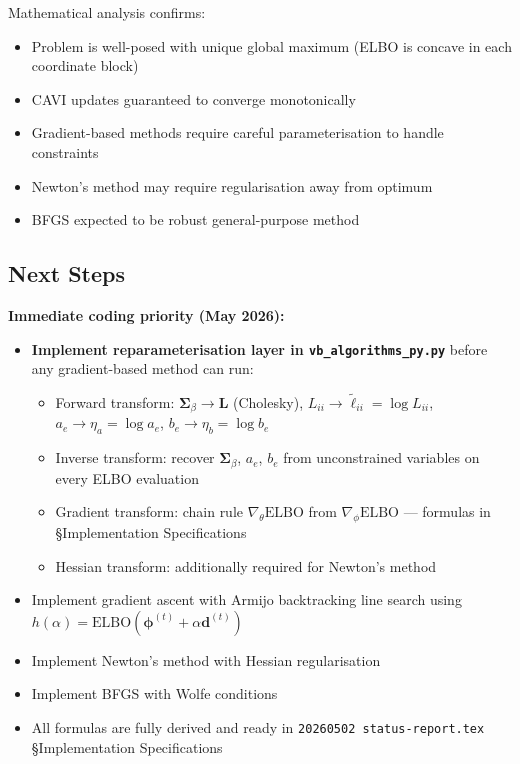 \documentclass[11pt]{article}
\begin{document}
Mathematical analysis confirms:
\begin{itemize}
\item Problem is well-posed with unique global maximum (ELBO is concave in each coordinate block)
\item CAVI updates guaranteed to converge monotonically
\item Gradient-based methods require careful parameterisation to handle constraints
\item Newton's method may require regularisation away from optimum
\item BFGS expected to be robust general-purpose method
\end{itemize}

\newpage
\subsection*{Next Steps}

\textbf{Immediate coding priority (May 2026):}
\begin{itemize}
  \item[\textbf{!}] \textbf{Implement reparameterisation layer in \texttt{vb\_algorithms\_py.py}} before any gradient-based method can run:
  \begin{itemize}
    \item Forward transform: $\bm{\Sigma}_\beta \to \bm{L}$ (Cholesky), $L_{ii} \to \tilde\ell_{ii} = \log L_{ii}$, $a_e \to \eta_a = \log a_e$, $b_e \to \eta_b = \log b_e$
    \item Inverse transform: recover $\bm{\Sigma}_\beta$, $a_e$, $b_e$ from unconstrained variables on every ELBO evaluation
    \item Gradient transform: chain rule $\nabla_\theta \text{ELBO}$ from $\nabla_\phi \text{ELBO}$ --- formulas in \S Implementation Specifications
    \item Hessian transform: additionally required for Newton's method
  \end{itemize}
  \item Implement gradient ascent with Armijo backtracking line search using $h(\alpha) = \text{ELBO}(\bm{\phi}^{(t)} + \alpha \bm{d}^{(t)})$
  \item Implement Newton's method with Hessian regularisation
  \item Implement BFGS with Wolfe conditions
  \item All formulas are fully derived and ready in \texttt{20260502 status-report.tex} \S Implementation Specifications
\end{itemize}
\end{document}
